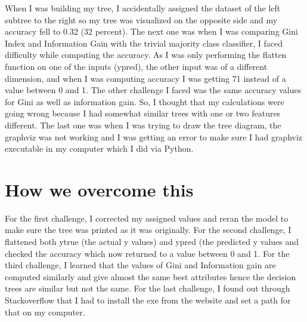 \documentclass[a4paper]{article}
\begin{document}
When I was building my tree, I accidentally assigned the dataset of the left subtree to the right so my tree was visualized on the opposite side and my accuracy fell to 0.32 (32 percent). The next one was when I was comparing Gini Index and Information Gain with the trivial majority class classifier, I faced difficulty while computing the accuracy. As I was only performing the flatten function on one of the inputs (ypred), the other input was of a different dimension, and when I was computing accuracy I was getting 71 instead of a value between 0 and 1. The other challenge I faced was the same accuracy values for Gini as well as information gain. So, I thought that my calculations were going wrong because I had somewhat similar trees with one or two features different. The last one was when I was trying to draw the tree diagram, the graphviz was not working and I was getting an error to make sure I had graphviz executable in my computer which I did via Python.

\section*{How we overcome this}
For the first challenge, I corrected my assigned values and reran the model to make sure the tree was printed as it was originally. For the second challenge, I flattened both ytrue (the actual y values) and ypred (the predicted y values and checked the accuracy which now returned to a value between 0 and 1. For the third challenge, I learned that the values of Gini and Information gain are computed similarly and give almost the same best attributes hence the decision trees are similar but not the same. For the last challenge, I found out through Stackoverflow that I had to install the exe from the website and set a path for that on my computer.
\end{document}
